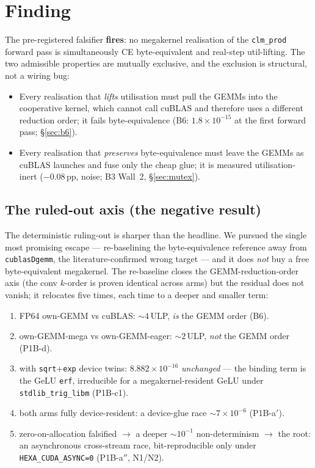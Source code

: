 \documentclass[11pt,a4paper]{article}
\begin{document}
\section{Finding}
\label{sec:finding}

The pre-registered falsifier \textbf{fires}: no megakernel realisation of the
\texttt{clm\_prod} forward pass is simultaneously CE byte-equivalent and
real-step util-lifting. The two admissible properties are mutually exclusive,
and the exclusion is structural, not a wiring bug:

\begin{itemize}\itemsep0.3em
\item Every realisation that \emph{lifts} utilisation must pull the GEMMs
into the cooperative kernel, which cannot call cuBLAS and therefore uses a
different reduction order; it fails byte-equivalence (B6: $1.8\times10^{-15}$
at the first forward pass; \S\ref{sec:b6}).
\item Every realisation that \emph{preserves} byte-equivalence must leave the
GEMMs as cuBLAS launches and fuse only the cheap glue; it is measured
utilisation-inert ($-0.08$\,pp, noise; B3 Wall~2, \S\ref{sec:mutex}).
\end{itemize}

\subsection{The ruled-out axis (the negative result)}

The deterministic ruling-out is sharper than the headline. We pursued the
single most promising escape --- re-baselining the byte-equivalence
reference away from \texttt{cublasDgemm}, the literature-confirmed wrong
target --- and it does \emph{not} buy a free byte-equivalent megakernel. The
re-baseline closes the GEMM-reduction-order axis (the conv $k$-order is
proven identical across arms) but the residual does not vanish; it relocates
five times, each time to a deeper and smaller term:

\begin{enumerate}\itemsep0.25em
\item FP64 own-GEMM vs cuBLAS: ${\sim}4$\,ULP, \emph{is} the GEMM order (B6).
\item own-GEMM-mega vs own-GEMM-eager: ${\sim}2$\,ULP, \emph{not} the GEMM
order (P1B-d).
\item with \texttt{sqrt}+\texttt{exp} device twins: $8.882\times10^{-16}$
\emph{unchanged} --- the binding term is the GeLU \texttt{erf}, irreducible
for a megakernel-resident GeLU under \texttt{stdlib\_trig\_libm} (P1B-c1).
\item both arms fully device-resident: a device-glue race
${\sim}7\times10^{-6}$ (P1B-a$'$).
\item zero-on-allocation falsified $\to$ a deeper ${\sim}10^{-1}$
non-determinism $\to$ the root: an asynchronous cross-stream race,
bit-reproducible only under \texttt{HEXA\_CUDA\_ASYNC=0} (P1B-a$''$, N1/N2).
\end{enumerate}
\end{document}
